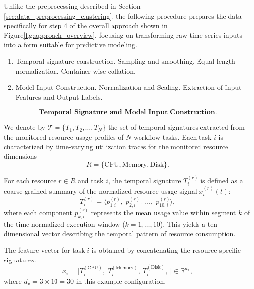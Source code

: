 \label{sec:data_preprocessing_predictive}

Unlike the preprocessing described in Section \ref{sec:data_preprocessing_clustering}, the following procedure prepares the data specifically for step 4 of the overall approach shown in Figure\ref{fig:approach_overview}, focusing on transforming raw time-series inputs into a form suitable for predictive modeling.

\begin{enumerate}
    \item Temporal signature construction.
          \subitem Sampling and smoothing.
          \subitem Equal-length normalization.
          \subitem Container-wise collation.
    \item Model Input Construction.
          \subitem Normalization and Scaling.
          \subitem Extraction of Input Features and Output Labels.
\end{enumerate}


\[
    \textbf{Temporal Signature and Model Input Construction.}
\]

We denote by \( \mathcal{T} = \{ T_1, T_2, \dots, T_N \} \) the set of
temporal signatures extracted from the monitored resource-usage profiles
of \( N \) workflow tasks.
Each task \( i \) is characterized by time-varying utilization traces
for the monitored resource dimensions
\[
    R = \{ \text{CPU}, \text{Memory}, \text{Disk} \}.
\]

\noindent
For each resource \( r \in R \) and task \( i \),
the temporal signature \( T_i^{(r)} \) is defined as a
coarse-grained summary of the normalized resource usage signal
\( x_i^{(r)}(t) \):
\[
    T_i^{(r)} =
    \bigl\langle
    p_{1,i}^{(r)},\;
    p_{2,i}^{(r)},\;
    \dots,\;
    p_{10,i}^{(r)}
    \bigr\rangle,
    \tag{1}
\]
where each component \( p_{k,i}^{(r)} \) represents the mean
usage value within segment \( k \) of the time-normalized
execution window (\( k = 1, \dots, 10 \)).
This yields a ten-dimensional vector describing the temporal pattern of
resource consumption.

\noindent
The feature vector for task \( i \) is obtained by concatenating
the resource-specific signatures:
\[
    x_i =
    \bigl[
    T_i^{(\text{CPU})},\;
    T_i^{(\text{Memory})},\;
    T_i^{(\text{Disk})},\;
    \bigr]
    \in \mathbb{R}^{d_x},
\]
where \( d_x = 3 \times 10 = 30 \) in this example configuration.

